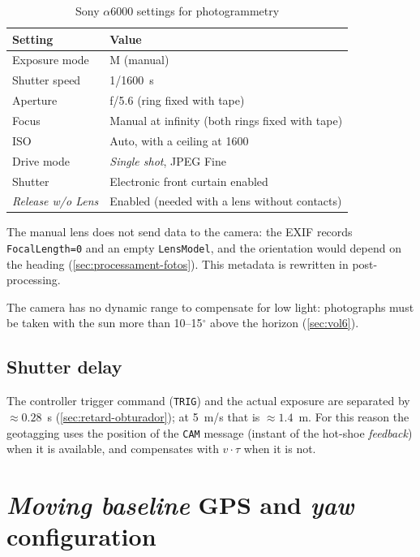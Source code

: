 \begin{table}[H]
    \centering
    \caption{Sony $\alpha$6000 settings for photogrammetry}
    \label{tab:ajust-camera}
    \begin{tabular}{ll}
        \toprule
        Setting & Value \\
        \midrule
        Exposure mode & M (manual) \\
        Shutter speed & 1/1600~s \\
        Aperture & f/5.6 (ring fixed with tape) \\
        Focus & Manual at infinity (both rings fixed with tape) \\
        ISO & Auto, with a ceiling at 1600 \\
        Drive mode & \emph{Single shot}, JPEG Fine \\
        Shutter & Electronic front curtain enabled \\
        \emph{Release w/o Lens} & Enabled (needed with a lens without contacts) \\
        \bottomrule
    \end{tabular}
\end{table}

The manual lens does not send data to the camera: the EXIF records \texttt{FocalLength=0} and an empty \texttt{LensModel}, and the orientation would depend on the heading (\cref{sec:processament-fotos}). This metadata is rewritten in post-processing.

The camera has no dynamic range to compensate for low light: photographs must be taken with the sun more than 10--15$^{\circ}$ above the horizon (\cref{sec:vol6}).

\subsection{Shutter delay}

The controller trigger command (\texttt{TRIG}) and the actual exposure are separated by $\approx 0.28$~s (\cref{sec:retard-obturador}); at 5~m/s that is $\approx 1.4$~m. For this reason the geotagging uses the position of the \texttt{CAM} message (instant of the hot-shoe \emph{feedback}) when it is available, and compensates with $v\cdot\tau$ when it is not.

\section{\emph{Moving baseline} GPS and \emph{yaw} configuration}
\label{subsec:gps-moving-baseline}

